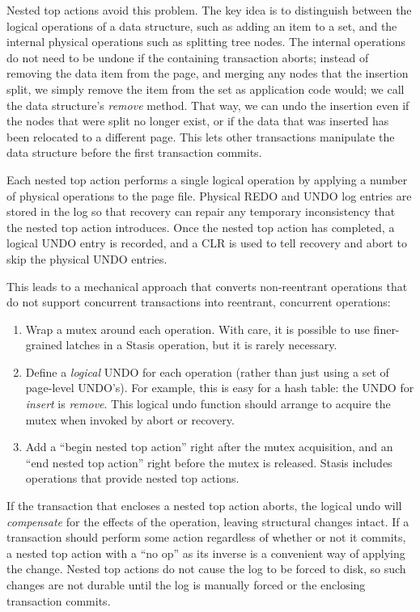 \documentclass[letterpaper,twocolumn,10pt]{article}
\newcommand{\yad}{Stasis\xspace}
\begin{document}
Nested top actions avoid this problem.  The key idea is to distinguish
between the logical operations of a data structure, such as
adding an item to a set, and the internal physical operations such as
splitting tree nodes. 
The internal operations do not need to be undone if the
containing transaction aborts; instead of removing the data item from
the page, and merging any nodes that the insertion split, we simply
remove the item from the set as application code would; we call the
data structure's {\em remove} method.  That way, we can undo the
insertion even if the nodes that were split no longer exist, or if the
data that was inserted has been relocated to a different page.  This
lets other transactions manipulate the data structure before the first
transaction commits.

Each nested top action performs a single logical operation by applying
a number of physical operations to the page file.  Physical REDO and
UNDO log entries are stored in the log so that recovery can repair any
temporary inconsistency that the nested top action introduces.  Once
the nested top action has completed, a logical UNDO entry is recorded,
and a CLR is used to tell recovery and abort to skip the physical
UNDO entries.

This leads to a mechanical approach that converts non-reentrant
operations that do not support concurrent transactions into reentrant,
concurrent operations:

\begin{enumerate}
\item Wrap a mutex around each operation.  With care, it is possible 
  to use finer-grained latches in a \yad operation, but it is rarely necessary.
\item Define a {\em logical} UNDO for each operation (rather than just
  using a set of page-level UNDO's).  For example, this is easy for a
  hash table: the UNDO for {\em insert} is {\em remove}.  This logical
  undo function should arrange to acquire the mutex when invoked by
  abort or recovery.
\item Add a ``begin nested top action'' right after the mutex
  acquisition, and an ``end nested top action'' right before the mutex
  is released.  \yad includes operations that provide nested top
  actions.
\end{enumerate}

If the transaction that encloses a nested top action aborts, the
logical undo will {\em compensate} for the effects of the operation,
leaving structural changes intact.  If a transaction should perform
some action regardless of whether or not it commits, a nested top
action with a ``no op'' as its inverse is a convenient way of applying
the change.  Nested top actions do not cause the log to be forced to
disk, so such changes are not durable until the log is manually forced
or the enclosing transaction commits.
\end{document}
